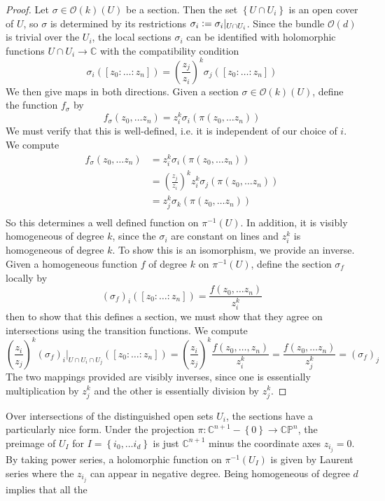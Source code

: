 \documentclass[psamsfonts, 12pt]{amsart}
\theoremstyle{definition}
\theoremstyle{remark}
\renewcommand{\O}{\mathcal{O}}
\newcommand{\C}{\mathbb{C}}
\newcommand{\CP}{\mathbb{CP}}
\newcommand{\inv}{^{-1}}
\newcommand{\set}[1]{\left\lbrace #1 \right\rbrace}
\newcommand{\defeq}{\vcentcolon=}
\begin{document}
\begin{proof}
Let $\sigma \in \O(k)(U)$ be a section. Then the set $\set{U \cap U_i}$ is an
open cover of $U$, so $\sigma$ is determined by its restrictions
$\sigma_i \defeq \sigma_i\vert_{U \cap U_i}$. Since the bundle $\O(d)$ is trivial
over the $U_i$, the local sections $\sigma_i$ can be identified with holomorphic
functions $U \cap U_i \to \C$ with the compatibility condition
\[
\sigma_i([z_0 :\ldots : z_n])
= \left(\frac{z_j}{z_i}\right)^k\sigma_j([z_0: \ldots : z_n])
\]
We then give maps in both directions. Given a section
$\sigma \in \O(k)(U)$, define the function $f_\sigma$ by
\[
f_\sigma(z_0,\ldots z_n) = z_i^k\sigma_i(\pi(z_0,\ldots z_n))
\]
We must verify that this is well-defined, i.e. it is independent of our choice of $i$.
We compute
\begin{align*}
f_\sigma(z_0,\ldots z_n)
&=  z_i^k\sigma_i(\pi(z_0,\ldots z_n)) \\
&=  \left(\frac{z_j}{z_i}\right)^kz_i^k\sigma_j(\pi(z_0,\ldots z_n)) \\
&= z_j^k\sigma_k(\pi(z_0, \ldots z_n)) \\
\end{align*}
So this determines a well defined function on $\pi\inv(U)$. In addition, it is
visibly homogeneous of degree $k$, since the $\sigma_i$ are constant on lines and
$z_i^k$ is homogeneous of degree $k$. To show this is an isomorphism, we provide
an inverse. Given a homogeneous function $f$ of degree $k$ on $\pi\inv(U)$, define
the section $\sigma_f$ locally by
\[
(\sigma_f)_i([z_0: \ldots :z_n]) = \frac{f(z_0,\ldots z_n)}{z_i^k}
\]
then to show that this defines a section, we must show that they agree on intersections
using the transition functions. We compute
\[
\left(\frac{z_i}{z_j}\right)^k(\sigma_f)_i\vert_{U \cap U_i \cap U_j}([z_0: \ldots : z_n])
= \left(\frac{z_i}{z_j}\right)^k\frac{f(z_0,\ldots, z_n)}{z_i^k}
= \frac{f(z_0, \ldots z_n)}{z_j^k}
= (\sigma_f)_j
\]
The two mappings provided are visibly inverses, since one is essentially multiplication
by $z_j^k$ and the other is essentially division by $z_j^k$.
\end{proof}
%
Over intersections of the distinguished open sets $U_i$, the sections have
a particularly nice form. Under the projection $\pi : \C^{n+1}-\set{0} \to \CP^n$,
the preimage of $U_I$ for $I = \set{i_0, \ldots i_d}$ is just $\C^{n+1}$ minus
the coordinate axes $z_{i_j} = 0$. By taking power series, a holomorphic
function on $\pi\inv(U_I)$ is given by Laurent series where the $z_{i_j}$ can appear
in negative degree. Being homogeneous of degree $d$ implies that all the
\end{document}
